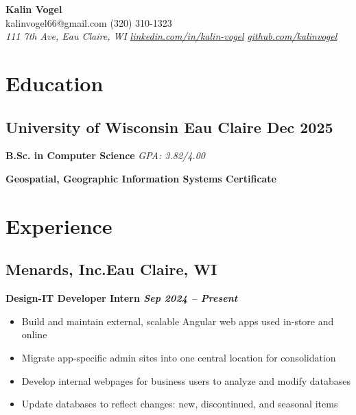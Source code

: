 \documentclass[a4paper,10pt]{article}
\newcommand{\name}[1]{\fontsize{12}{10}\selectfont \textbf{#1}}
\newcommand{\contact}[2]{#1 \hfill #2}
\newcommand{\contactinfo}[3]{\textit{#1} \hfill \textit{#2} \hfill \textit{#3}}
\begin{document}
\name{Kalin Vogel} \\
\contact{ kalinvogel66@gmail.com}{\faIcon{phone} (320) 310-1323} \\
\contactinfo{ 111 7th Ave, Eau Claire, WI}{\faIcon{linkedin} \href{https://www.linkedin.com/in/yourprofile}{linkedin.com/in/kalin-vogel}}{\faIcon{github} \href{https://github.com/yourusername}{github.com/kalinvogel}}
\section*{Education}
\subsection*{\textbf{University of Wisconsin Eau Claire} \hfill \textbf{Dec 2025}} 
\textbf{B.Sc. in Computer Science} \hfill \textit{GPA: 3.82/4.00} \\

{\fontsize{12}{18}
}
\vspace{.6em} %

\textbf{\hspace*{10pt}Geospatial, Geographic Information Systems Certificate}

\section*{Experience}
\subsection*{{Menards, Inc.}\hfill\textbf{Eau Claire, WI}}

\hspace{12pt}\textbf{{Design-IT Developer Intern} \hfill \textit{Sep 2024 – Present}} \\
\vspace{-1em}
{\fontsize{12}{15}\selectfont
\begin{itemize}[leftmargin=30pt]
    \item Build and maintain external, scalable Angular web apps used in-store and online
    \item Migrate app-specific admin sites into one central location for consolidation
    \item Develop internal webpages for business users to analyze and modify databases
    \item Update databases to reflect changes: new, discontinued, and seasonal items
\end{itemize}
}
\end{document}

